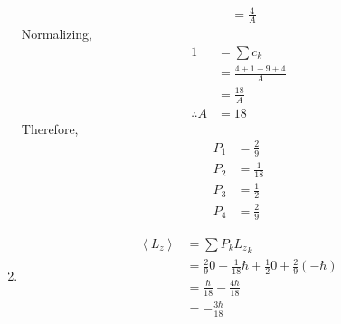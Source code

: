 \documentclass[fleqn, a4paper, 11pt, oneside]{amsart}
\theoremstyle{definition}
\theoremstyle{theorem}
\begin{document}
\begin{solution}
\begin{enumerate}[leftmargin=*]
\begin{align*}
                                                  & = \frac{4}{A}
			\end{align*}
			Normalizing,
			\begin{align*}
				1            & = \sum c_k                \\
                                             & = \frac{4 + 1 + 9 + 4}{A} \\
                                             & = \frac{18}{A}            \\
				\therefore A & = 18
			\end{align*}
			Therefore,
			\begin{align*}
				P_1 & = \frac{2}{9}  \\
				P_2 & = \frac{1}{18} \\
				P_3 & = \frac{1}{2}  \\
				P_4 & = \frac{2}{9}
			\end{align*}
		\item
			\begin{align*}
				\left\langle L_z \right\rangle & = \sum P_k {L_z}_k                                                          \\
                                                               & = \frac{2}{9} 0 + \frac{1}{18} \hbar + \frac{1}{2} 0 + \frac{2}{9} (-\hbar) \\
                                                               & = \frac{\hbar}{18} - \frac{4 \hbar}{18}                                     \\
                                                               & = -\frac{3 \hbar}{18}
			\end{align*}
	\end{enumerate}
\end{solution}
\end{document}
